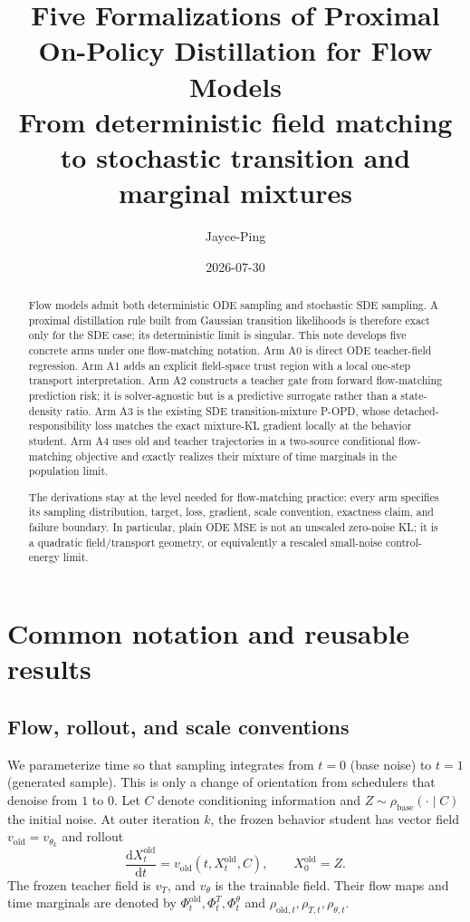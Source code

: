 \documentclass[11pt,a4paper]{article}
\title{\textbf{Five Formalizations of Proximal On-Policy Distillation for Flow Models}\\[0.3em]
\large From deterministic field matching to stochastic transition and marginal mixtures}
\author{Jayce-Ping}
\date{2026-07-30}
\newcommand{\dd}{\mathrm{d}}
\newcommand{\vold}{v_{\mathrm{old}}}
\newcommand{\vT}{v_T}
\newcommand{\vtheta}{v_\theta}
\theoremstyle{plain}
\theoremstyle{definition}
\begin{document}
\maketitle

\begin{abstract}
Flow models admit both deterministic ODE sampling and stochastic SDE sampling.  A proximal
distillation rule built from Gaussian transition likelihoods is therefore exact only for the SDE
case; its deterministic limit is singular.  This note develops five concrete arms under one
flow-matching notation.  Arm A0 is direct ODE teacher-field regression.  Arm A1 adds an explicit
field-space trust region with a local one-step transport interpretation.  Arm A2 constructs a
teacher gate from forward flow-matching prediction risk; it is solver-agnostic but is a predictive
surrogate rather than a state-density ratio.  Arm A3 is the existing SDE transition-mixture P-OPD,
whose detached-responsibility loss matches the exact mixture-KL gradient locally at the behavior
student.  Arm A4 uses old and teacher trajectories in a two-source conditional flow-matching
objective and exactly realizes their mixture of time marginals in the population limit.

The derivations stay at the level needed for flow-matching practice: every arm specifies its
sampling distribution, target, loss, gradient, scale convention, exactness claim, and failure
boundary.  In particular, plain ODE MSE is not an unscaled zero-noise KL; it is a quadratic
field/transport geometry, or equivalently a rescaled small-noise control-energy limit.
\end{abstract}

\tableofcontents
\newpage

\section{Common notation and reusable results}
\label{sec:common}

\subsection{Flow, rollout, and scale conventions}

We parameterize time so that sampling integrates from $t=0$ (base noise) to $t=1$ (generated
sample).  This is only a change of orientation from schedulers that denoise from $1$ to $0$.  Let
$C$ denote conditioning information and $Z\sim\rho_{\mathrm{base}}(\cdot\mid C)$ the initial
noise.  At outer iteration $k$, the frozen behavior student has vector field
$\vold=v_{\theta_k}$ and rollout
\begin{equation}
\frac{\dd X_t^{\mathrm{old}}}{\dd t}
  =\vold(t,X_t^{\mathrm{old}},C),
\qquad
X_0^{\mathrm{old}}=Z .
\label{eq:old-ode}
\end{equation}
The frozen teacher field is $\vT$, and $\vtheta$ is the trainable field.  Their flow maps and
time marginals are denoted by $\Phi_t^{\mathrm{old}},\Phi_t^T,\Phi_t^\theta$ and
$\rho_{\mathrm{old},t},\rho_{T,t},\rho_{\theta,t}$.
\end{document}
